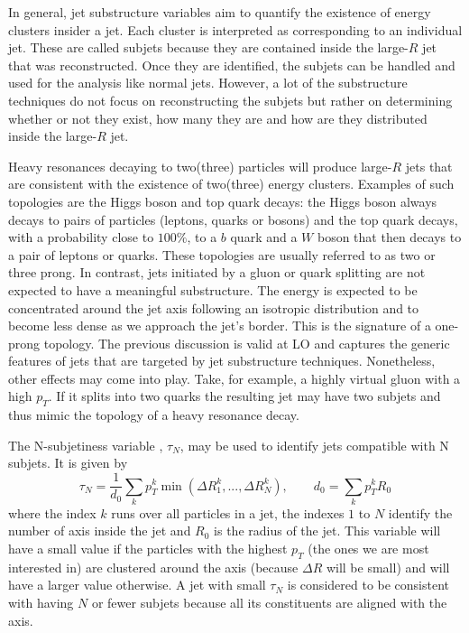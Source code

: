 In general, jet substructure variables aim to quantify the existence of energy clusters  insider a jet. Each cluster is interpreted as corresponding to an individual jet. These are called subjets because they are contained inside the large-$R$ jet that was reconstructed. Once they are identified, the subjets can be handled and used for the analysis like normal jets. However, a lot of the substructure techniques do not focus on reconstructing the subjets but rather on determining whether or not they exist, how many they are and how are they distributed inside the large-$R$ jet. 

Heavy resonances decaying to two(three) particles will produce large-$R$ jets that are consistent with the existence of two(three) energy clusters. Examples of such topologies are the Higgs boson and top quark decays: the Higgs boson always decays to pairs of particles (leptons, quarks or bosons) and the top quark decays, with a probability close to $100\%$, to a $b$ quark and a $W$ boson that then decays to a pair of leptons or quarks. These topologies are usually referred to as two or three prong. In contrast, jets initiated by a gluon or quark splitting are not expected to have a meaningful substructure. The energy is expected to be concentrated around the jet axis following an isotropic distribution and to become less dense as we approach the jet's border. This is the signature of a one-prong topology. The previous discussion is valid at LO and captures the generic features of jets that are targeted by jet substructure techniques. Nonetheless, other effects may come into play. Take, for example, a highly virtual gluon with a high $p_T$. If it splits into two quarks the resulting jet may have two subjets and thus mimic the topology of a heavy resonance decay.

The N-subjetiness variable \cite{Nsubjetiness}, $\tau_N$, may be used to identify jets compatible with N subjets. It is given by 
\begin{equation}
	\tau_N = \frac{1}{d_0}\sum_{k}p_T^k \min(\Delta R_1^k,...,\Delta R_N^k), \qquad d_0=\sum_{k}p_T^k R_0
\end{equation}
where the index $k$ runs over all particles in a jet, the indexes $1$ to $N$ identify the number of axis inside the jet and $R_0$ is the radius of the jet. This variable will have a small value if the particles with the highest $p_T$ (the ones we are most interested in) are clustered around the axis (because $\Delta R$ will be small) and will have a larger value otherwise. A jet with small $\tau_N$ is considered to be consistent with having $N$ or fewer subjets because all its constituents are aligned with the axis.

